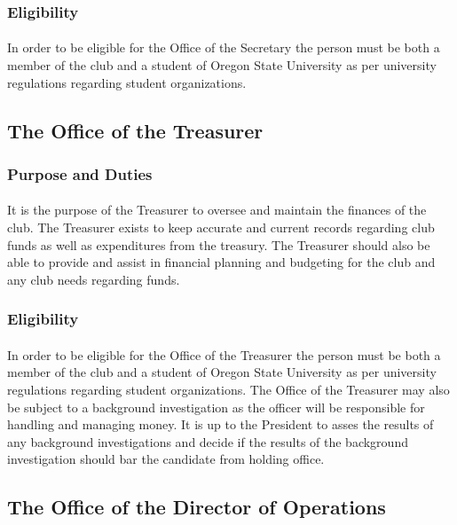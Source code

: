 \documentclass[12pt]{article}
\begin{document}
\subsubsection{Eligibility}
\paragraph{}
In order to be eligible for the Office of the Secretary the person must be both a member of the club and a student of Oregon State University as per university regulations regarding student organizations.

\subsection{The Office of the Treasurer}
\subsubsection{Purpose and Duties}
\paragraph{}
It is the purpose of the Treasurer to oversee and maintain the finances of the club. The Treasurer exists to keep accurate and current records regarding club funds as well as expenditures from the treasury.
The Treasurer should also be able to provide and assist in financial planning and budgeting for the club and any club needs regarding funds.
\subsubsection{Eligibility}
\paragraph{}
In order to be eligible for the Office of the Treasurer the person must be both a member of the club and a student of Oregon State University as per university regulations regarding student organizations.
The Office of the Treasurer may also be subject to a background investigation as the officer will be responsible for handling and managing money.
It is up to the President to asses the results of any background investigations and decide if the 
results of the background investigation should bar the candidate from holding office.


\subsection{The Office of the Director of Operations}
\end{document}
